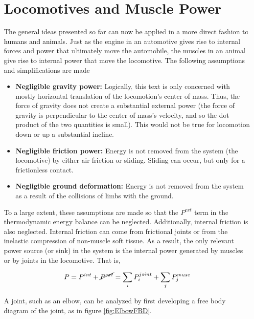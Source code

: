 \section{Locomotives and Muscle Power}
\label{sec:LocomotivesAndMusclePower}

The general ideas presented so far can now be applied in a more direct fashion to humans and animals. Just as the engine in an automotive gives rise to internal forces and power that ultimately move the automobile, the muscles in an animal give rise to internal power that move the locomotive. The following assumptions and simplifications are made

\begin{itemize}
\item \textbf{Negligible gravity power:} Logically, this text is only concerned with mostly horizontal translation of the locomotion's center of mass. Thus, the force of gravity does not create a substantial external power (the force of gravity is perpendicular to the center of mass's velocity, and so the dot product of the two quantities is small). This would not be true for locomotion down or up a substantial incline.
\item \textbf{Negligible friction power:} Energy is not removed from the system (the locomotive) by either air friction or sliding. Sliding can occur, but only for a frictionless contact.
\item \textbf{Negligible ground deformation:} Energy is not removed from the system as a result of the collisions of limbs with the ground.
\end{itemize}

To a large extent, these assumptions are made so that the $P^{ext}$ term in the thermodynamic energy balance can be neglected. Additionally, internal friction is also neglected. Internal friction can come from frictional joints or from the inelastic compression of non-muscle soft tissue. As a result, the only relevant power source (or sink) in the system is the internal power generated by muscles or by joints in the locomotive. That is,

\begin{equation}
P = P^{int} + \cancel{P^{ext}} = \sum_{i} P_{i}^{joint} + \sum_{j} P_{j}^{musc}
\end{equation}

A joint, such as an elbow, can be analyzed by first developing a free body diagram of the joint, as in figure \ref{fig:ElbowFBD}.

